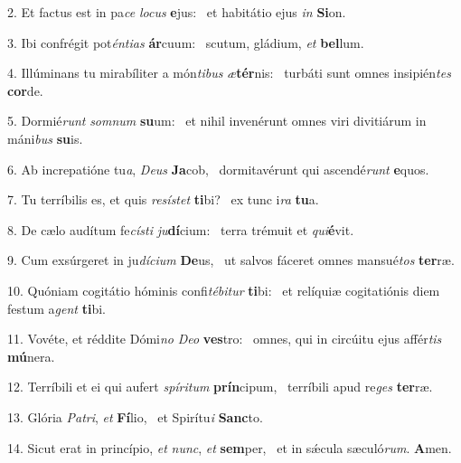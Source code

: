 2. Et factus est in pa\textit{ce} \textit{lo}\textit{cus} \textbf{e}jus: \ast\  et habitátio ejus \textit{in} \textbf{Si}on.\

3. Ibi confrégit pot\textit{én}\textit{ti}\textit{as} \textbf{ár}cuum: \ast\  scutum, gládium, \textit{et} \textbf{bel}lum.\

4. Illúminans tu mirabíliter a món\textit{ti}\textit{bus} \textit{æ}\textbf{tér}nis: \ast\  turbáti sunt omnes insipién\textit{tes} \textbf{cor}de.\

5. Dormié\textit{runt} \textit{som}\textit{num} \textbf{su}um: \ast\  et nihil invenérunt omnes viri divitiárum in máni\textit{bus} \textbf{su}is.\

6. Ab increpatióne tu\textit{a}, \textit{De}\textit{us} \textbf{Ja}cob, \ast\  dormitavérunt qui ascendé\textit{runt} \textbf{e}quos.\

7. Tu terríbilis es, et quis \textit{re}\textit{sís}\textit{tet} \textbf{ti}bi? \ast\  ex tunc i\textit{ra} \textbf{tu}a.\

8. De cælo audítum fe\textit{cís}\textit{ti} \textit{ju}\textbf{dí}cium: \ast\  terra trémuit et \textit{qui}\textbf{é}vit.\

9. Cum exsúrgeret in ju\textit{dí}\textit{ci}\textit{um} \textbf{De}us, \ast\  ut salvos fáceret omnes mansué\textit{tos} \textbf{ter}ræ.\

10. Quóniam cogitátio hóminis confi\textit{té}\textit{bi}\textit{tur} \textbf{ti}bi: \ast\  et relíquiæ cogitatiónis diem festum a\textit{gent} \textbf{ti}bi.\

11. Vovéte, et réddite Dómi\textit{no} \textit{De}\textit{o} \textbf{ves}tro: \ast\  omnes, qui in circúitu ejus affér\textit{tis} \textbf{mú}nera.\

12. Terríbili et ei qui aufert \textit{spí}\textit{ri}\textit{tum} \textbf{prín}cipum, \ast\  terríbili apud re\textit{ges} \textbf{ter}ræ.\

13. Glória \textit{Pa}\textit{tri}, \textit{et} \textbf{Fí}lio, \ast\  et Spirítu\textit{i} \textbf{Sanc}to.\

14. Sicut erat in princípio, \textit{et} \textit{nunc}, \textit{et} \textbf{sem}per, \ast\  et in sǽcula sæculó\textit{rum}. \textbf{A}men.\

